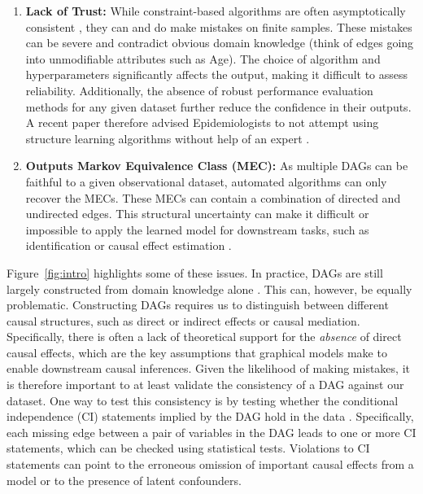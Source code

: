 \documentclass{uai2025} %
\begin{document}
\begin{enumerate}
	\item \textbf{Lack of Trust:} While constraint-based algorithms are 
		often asymptotically
		consistent \citep{KalischB07}, they can and do make mistakes
		on  finite samples. These mistakes can be severe and contradict
		obvious domain knowledge (think of edges going into unmodifiable
		attributes such as Age). The choice of algorithm and hyperparameters
		significantly affects the output, making it
		difficult to assess reliability. Additionally, the absence of
		robust performance evaluation methods for any given dataset
		further reduce the confidence in their outputs. A recent paper
		therefore advised Epidemiologists to not attempt using structure
		learning algorithms without help of an expert \citep{Gururaghavendran_2024}.
	\item \textbf{Outputs Markov Equivalence Class (MEC):} As multiple
		DAGs can be faithful to a given observational dataset, automated 
		algorithms can only recover the MECs. These MECs can contain a
		combination of directed and undirected edges. This structural uncertainty
		can make it difficult or impossible to apply the learned model for downstream
		tasks, such as identification or causal
		effect estimation \citep{Maathuis_2009,PerkovicTKM17}.
\end{enumerate}

Figure~\ref{fig:intro} highlights some of these issues. In practice, DAGs 
are still largely constructed from domain knowledge alone 
\citep{Tennant2020,Petersen2021}. This can, however, be equally problematic.
Constructing DAGs requires us to distinguish between different causal structures, 
such as direct or indirect effects or causal mediation. Specifically, there is often a lack
of theoretical support for the \emph{absence} of direct causal effects, which are 
the key assumptions that graphical models make to enable downstream causal inferences.
Given the likelihood of making mistakes, it is therefore
important to at least validate the consistency of a DAG against our dataset. One way to
test this consistency is by testing whether the conditional independence 
(CI) statements implied by the DAG hold in the data \citep{Ankan2021}. Specifically, 
each missing edge between
a pair of variables in the DAG leads to one or more CI statements, 
which can be checked using statistical tests. Violations to CI
statements can point to the erroneous omission of important causal effects from a model
or to the presence of latent confounders.
\end{document}
